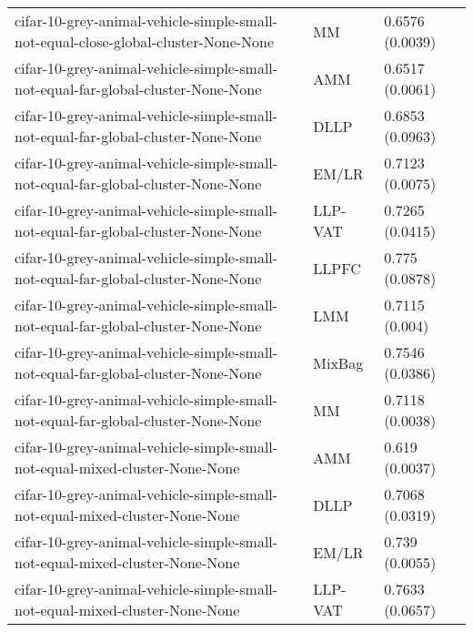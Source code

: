 \begin{longtable}{lll}
                           cifar-10-grey-animal-vehicle-simple-small-not-equal-close-global-cluster-None-None &        MM &                       0.6576 (0.0039) \\
                             cifar-10-grey-animal-vehicle-simple-small-not-equal-far-global-cluster-None-None &       AMM &                       0.6517 (0.0061) \\
                             cifar-10-grey-animal-vehicle-simple-small-not-equal-far-global-cluster-None-None &      DLLP &                       0.6853 (0.0963) \\
                             cifar-10-grey-animal-vehicle-simple-small-not-equal-far-global-cluster-None-None &     EM/LR &                       0.7123 (0.0075) \\
                             cifar-10-grey-animal-vehicle-simple-small-not-equal-far-global-cluster-None-None &   LLP-VAT &                       0.7265 (0.0415) \\
                             cifar-10-grey-animal-vehicle-simple-small-not-equal-far-global-cluster-None-None &     LLPFC &                        0.775 (0.0878) \\
                             cifar-10-grey-animal-vehicle-simple-small-not-equal-far-global-cluster-None-None &       LMM &                        0.7115 (0.004) \\
                             cifar-10-grey-animal-vehicle-simple-small-not-equal-far-global-cluster-None-None &    MixBag &                       0.7546 (0.0386) \\
                             cifar-10-grey-animal-vehicle-simple-small-not-equal-far-global-cluster-None-None &        MM &                       0.7118 (0.0038) \\
                                  cifar-10-grey-animal-vehicle-simple-small-not-equal-mixed-cluster-None-None &       AMM &                        0.619 (0.0037) \\
                                  cifar-10-grey-animal-vehicle-simple-small-not-equal-mixed-cluster-None-None &      DLLP &                       0.7068 (0.0319) \\
                                  cifar-10-grey-animal-vehicle-simple-small-not-equal-mixed-cluster-None-None &     EM/LR &                        0.739 (0.0055) \\
                                  cifar-10-grey-animal-vehicle-simple-small-not-equal-mixed-cluster-None-None &   LLP-VAT &                       0.7633 (0.0657) \\

\end{longtable}
